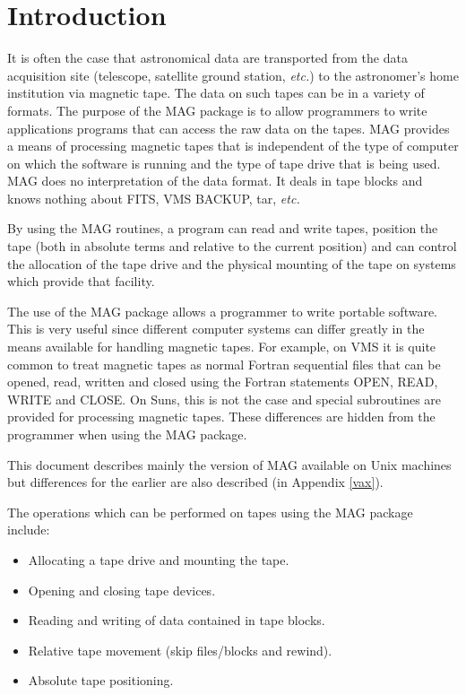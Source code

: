 \documentclass[11pt]{starlink}
\begin{document}
\scfrontmatter

\section{Introduction}

It is often the case that astronomical data are transported from the data
acquisition site (telescope, satellite ground station, \emph{etc.}) to the
astronomer's home institution via magnetic tape. The data on such tapes can be
in a variety of formats. The purpose of the MAG package is to allow
programmers to write applications programs that can access the raw data on the
tapes. MAG provides a means of processing magnetic tapes that is independent of
the type of computer on which the software is running and the type of tape
drive that is being used. MAG does no interpretation of the data format. It
deals in tape blocks and knows nothing about FITS, VMS BACKUP, tar, \emph{etc.}

By using the MAG routines, a program can read and write tapes, position the
tape (both in absolute terms and relative to the current position) and can
control the allocation of the tape drive and the physical mounting of the tape
on systems which provide that facility.

The use of the MAG package allows a programmer to write portable software. This
is very useful since different computer systems can differ greatly in the means
available for handling magnetic tapes. For example, on VMS it is quite common
to treat magnetic tapes as normal Fortran sequential files that can be opened,
read, written and closed using the Fortran statements OPEN, READ, WRITE and
CLOSE. On Suns, this is not the case and special subroutines are provided for
processing magnetic tapes. These differences are hidden from the programmer
when using the MAG package.

This document describes mainly the version of MAG available on Unix machines
but differences for the earlier
are also described (in Appendix \ref{vax}).

The operations which can be performed on tapes using the MAG package
include:

\begin{itemize}
\item Allocating a tape drive and mounting the tape.
\item Opening and closing tape devices.
\item Reading and writing of data contained in tape blocks.
\item Relative tape movement (skip files/blocks and rewind).
\item Absolute tape positioning.
\end{itemize}
\end{document}

